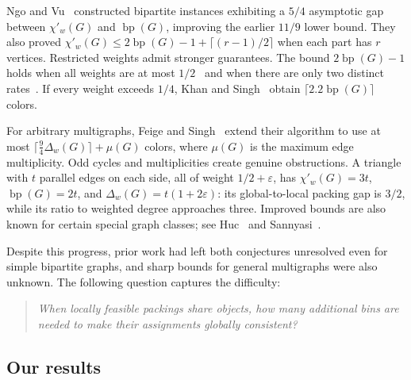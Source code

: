 \documentclass[11pt]{article}
\theoremstyle{definition}\newtheorem{algorithm}{Algorithm}[section]
\numberwithin{equation}{section}
\theoremstyle{remark}\newtheorem*{remark}{Remark}
\newcommand{\bp}{\operatorname{bp}}
\newcommand{\dw}{\Delta_w}
\newcommand{\cw}{\chi'_w}
\begin{document}
Ngo and Vu~\cite{NV} constructed bipartite instances exhibiting a
$5/4$ asymptotic gap between $\cw(G)$ and $\bp(G)$, improving the earlier $11/9$ lower bound. They also proved
$\cw(G)\le2\bp(G)-1+\lceil(r-1)/2\rceil$ when each part has $r$ vertices.
Restricted weights admit stronger guarantees. The bound
$2\bp(G)-1$ holds when all weights are at most $1/2$~\cite{MT89}
and when there are only two distinct rates~\cite{CR91}. If every weight
exceeds $1/4$, Khan and Singh~\cite{KS15} obtain
$\lceil2.2\bp(G)\rceil$ colors.


For arbitrary multigraphs, Feige and Singh~\cite{FS} extend their
algorithm to use at most $\lceil\frac94\dw(G)\rceil+\mu(G)$ colors,
where $\mu(G)$ is the maximum edge multiplicity.
Odd cycles and multiplicities create genuine
obstructions. A triangle with $t$ parallel edges on each side, all of weight
$1/2+\varepsilon$, has $\cw(G)=3t$, $\bp(G)=2t$, and
$\dw(G)=t(1+2\varepsilon)$: its global-to-local packing gap is $3/2$, while its ratio to weighted degree approaches three.
Improved bounds are also known
for certain special graph classes; see Huc~\cite{Huc11} and
Sannyasi~\cite{Sannyasi}. 

Despite this progress, prior work had left both conjectures unresolved even for simple bipartite graphs,
and sharp bounds for general multigraphs were also unknown. The following question captures the difficulty:
\begin{quote}
\emph{When locally feasible packings share objects, how many additional
bins are needed to make their assignments globally consistent?}
\end{quote}

\subsection{Our results}
\end{document}
